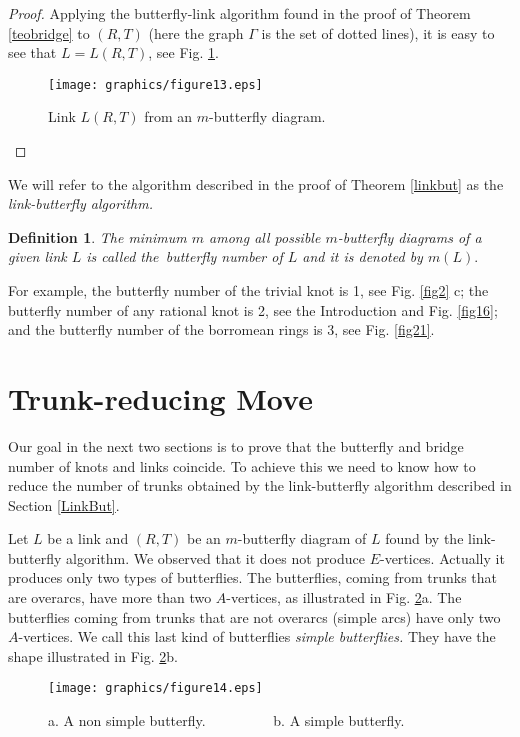 \documentclass{amsproc}\usepackage{eurosym}
\theoremstyle{plain}
\newtheorem{definition}{Definition}
\numberwithin{equation}{section}
\begin{document}
\begin{proof}
Applying the butterfly-link algorithm found in the proof of Theorem
\ref{teobridge} to $\left(  R,T\right)  $ (here the graph $\Gamma$ is the set
of dotted lines), it is easy to see that $L=L(R,T)$, see Fig. \ref{fig7}.
\begin{figure}
[h]
\begin{center}
\texttt{[image: graphics/figure13.eps]}\caption{Link $L\left(  R,T\right)  $ from an $m$-butterfly diagram.}\label{fig7}
\end{center}
\end{figure}


\end{proof}

We will refer to the algorithm described in the proof of Theorem \ref{linkbut}
as the \textit{link-butterfly algorithm.}

\begin{definition}
The minimum $m$ among all possible $m$-butterfly diagrams of a given link $L$
is called the\emph{\ butterfly number} of $L$ and it is denoted by $m(L).$
\end{definition}

For example, the butterfly number of the trivial knot is 1, see Fig.
\ref{fig2} c; the butterfly number of any rational knot is 2, see the
Introduction and Fig. \ref{fig16}; and the butterfly number of the borromean
rings is 3, see Fig. \ref{fig21}.

\section{\label{Move}Trunk-reducing Move}

Our goal in the next two sections is to prove that the butterfly and bridge
number of knots and links coincide. To achieve this we need to know how to
reduce the number of trunks obtained by the link-butterfly algorithm described
in Section \ref{LinkBut}.

Let $L$ be a link and $(R,T)$ be an $m$-butterfly diagram of $L$ found by the
link-butterfly algorithm. We observed that it does not produce $E$-vertices.
Actually it produces only two types of butterflies. The butterflies, coming
from trunks that are overarcs, have more than two $A$-vertices, as illustrated
in Fig. \ref{fig8}a. The butterflies coming from trunks that are not overarcs
(simple arcs) have only two $A$-vertices. We call this last kind of
butterflies \textit{simple butterflies. }They have the shape illustrated in
Fig. \ref{fig8}b.\begin{figure}
[h]
\begin{center}
\texttt{[image: graphics/figure14.eps]}\caption{a. A non simple butterfly. \ \ \ \ \ \ \ \ \ b. A simple butterfly.
\ \ \ }
\label{fig8}
\end{center}
\end{figure}
\end{document}
